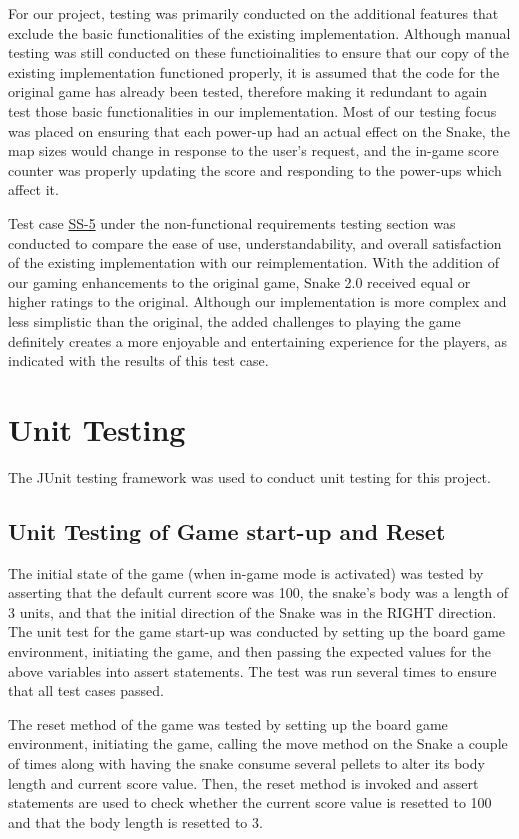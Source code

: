 \documentclass[12pt, titlepage]{article}
\begin{document}
For our project, testing was primarily conducted on the additional features that exclude the basic functionalities of the existing implementation. Although manual testing was still conducted on these functioinalities to ensure that our copy of the existing implementation functioned properly, it is assumed that the code for the original game has already been tested, therefore making it redundant to again test those basic functionalities in our implementation. Most of our testing focus was placed on ensuring that each power-up had an actual effect on the Snake, the map sizes would change in response to the user's request, and the in-game score counter was properly updating the score and responding to the power-ups which affect it.

Test case \hyperref[nfr:ss-5]{SS-5} under the non-functional requirements testing section was conducted to compare the ease of use, understandability, and overall satisfaction of the existing implementation with our reimplementation. With the addition of our gaming enhancements to the original game, Snake 2.0 received equal or higher ratings to the original. Although our implementation is more complex and less simplistic than the original, the added challenges to playing the game definitely creates a more enjoyable and entertaining experience for the players, as indicated with the results of this test case.

\section{Unit Testing}
The JUnit testing framework was used to conduct unit testing for this project.

\subsection{Unit Testing of Game start-up and Reset}
The initial state of the game (when in-game mode is activated) was tested by asserting that the default current score was 100, the snake's body was a length of 3 units, and that the initial direction of the Snake was in the RIGHT direction. The unit test for the game start-up was conducted by setting up the board game environment, initiating the game, and then passing the expected values for the above variables into assert statements. The test was run several times to ensure that all test cases passed.

The reset method of the game was tested by setting up the board game environment, initiating the game, calling the move method on the Snake a couple of times along with having the snake consume several pellets to alter its body length and current score value. Then, the reset method is invoked and assert statements are used to check whether the current score value is resetted to 100 and that the body length is resetted to 3. 
\end{document}
